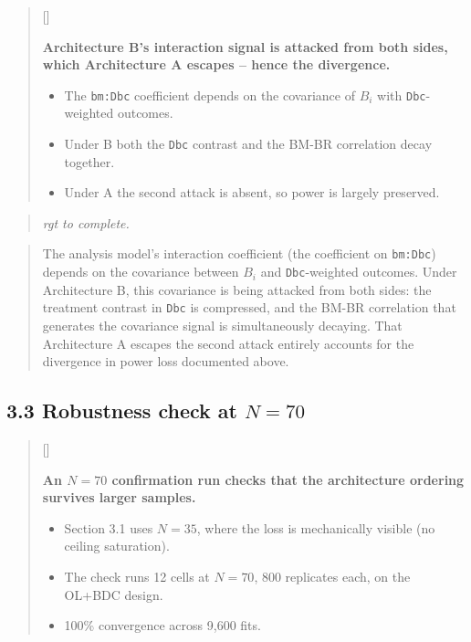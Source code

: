 \documentclass[
  11pt,
]{article}
\newcounter{pgraph}
\newenvironment{bullets}{%
  \stepcounter{pgraph}%
  \begin{quote}\small\sffamily\color[gray]{0.30}%
  {\normalfont\scriptsize\color[gray]{0.58}[\thepgraph]\enspace}}{%
  \end{quote}}
\newenvironment{rgt}{%
  \begin{quote}\small\itshape\color[RGB]{20,60,160}}{%
  \end{quote}}
\newenvironment{orig}{%
  \begin{quote}\normalsize\color[gray]{0.55}}{%
  \end{quote}}
\begin{document}
\begin{bullets}

\textbf{Architecture B's interaction signal is attacked from both
sides, which Architecture A escapes -- hence the divergence.}

\begin{itemize}\setlength{\itemsep}{2pt}\setlength{\parskip}{0pt}
\item The \texttt{bm:Dbc} coefficient depends on the covariance of
$B_i$ with \texttt{Dbc}-weighted outcomes.
\item Under B both the \texttt{Dbc} contrast and the BM-BR
correlation decay together.
\item Under A the second attack is absent, so power is largely
preserved.
\end{itemize}

\end{bullets}

\begin{rgt}
rgt to complete.

\end{rgt}

\begin{orig}
The analysis model's interaction coefficient (the coefficient on
\texttt{bm:Dbc}) depends on the covariance between \(B_i\) and
\texttt{Dbc}-weighted outcomes. Under Architecture B, this covariance is
being attacked from both sides: the treatment contrast in \texttt{Dbc}
is compressed, and the BM-BR correlation that generates the covariance
signal is simultaneously decaying. That Architecture A escapes the
second attack entirely accounts for the divergence in power loss
documented above.

\end{orig}

\subsection{3.3 Robustness check at $N = 70$}

\begin{bullets}

\textbf{An $N = 70$ confirmation run checks that the architecture
ordering survives larger samples.}

\begin{itemize}\setlength{\itemsep}{2pt}\setlength{\parskip}{0pt}
\item Section 3.1 uses $N = 35$, where the loss is mechanically
visible (no ceiling saturation).
\item The check runs 12 cells at $N = 70$, 800 replicates each, on
the OL+BDC design.
\item 100\% convergence across 9{,}600 fits.
\end{itemize}

\end{bullets}
\end{document}
